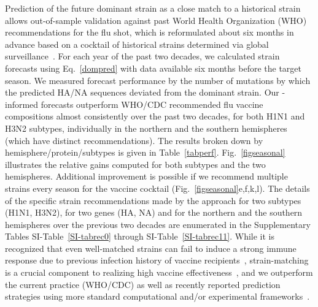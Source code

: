 \documentclass[onecolumn, compsoc,10pt]{IEEEtran}
\begin{document}
Prediction of the future dominant strain as  a close match to a historical strain  allows out-of-sample validation against past World Health Organization (WHO) recommendations for the flu shot, which  is  reformulated about six months in advance based on a  cocktail of historical strains determined via global surveillance~\cite{agor2018models}. For each year of the past two decades, we calculated strain forecasts using  Eq.~\eqref{dompred} with data available six months before the target season. We  measured forecast performance by the number of mutations by which the predicted HA/NA  sequences deviated from the  dominant strain. Our \enet-informed forecasts outperform  WHO/CDC recommended flu vaccine compositions almost consistently over the past two decades, for both H1N1 and H3N2 subtypes, individually in the northern and the southern hemispheres (which have distinct recommendations). %
%
The  results  broken down by hemisphere/protein/subtypes is given in Table~\ref{tabperf}. Fig.~\ref{figseasonal} illustrates the relative gains computed for both subtypes and the two hemispheres. %
Additional improvement is possible if we recommend multiple strains every season for the vaccine cocktail (Fig.~\ref{figseasonal}e,f,k,l). The details of the specific strain  recommendations made by the \enet approach for two subtypes (H1N1, H3N2), for two genes (HA, NA) and for the northern and the southern hemispheres over the previous two decades are enumerated in the Supplementary Tables SI-Table~\ref{SI-tabrec0} through SI-Table~\ref{SI-tabrec11}. While it is recognized that even well-matched strains can fail to induce a strong immune response due to previous infection history of vaccine recipients~\cite{cobey2018poor}, strain-matching is a crucial component to realizing high vaccine effectiveness~\cite{gouma2020antigenic}, and we  outperform the current practice (WHO/CDC) as well as  recently reported prediction strategies  using more standard computational and/or experimental frameworks~\cite{huddleston2020integrating,neher2014predicting}.
\end{document}
